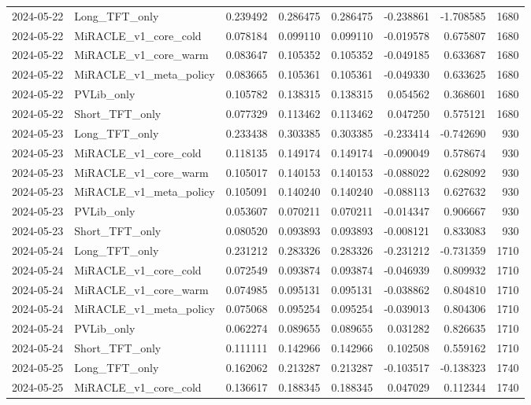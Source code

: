 \begin{tabular}{llrrrrrr}
2024-05-22 & Long_TFT_only & 0.239492 & 0.286475 & 0.286475 & -0.238861 & -1.708585 & 1680 \\
2024-05-22 & MiRACLE_v1_core_cold & 0.078184 & 0.099110 & 0.099110 & -0.019578 & 0.675807 & 1680 \\
2024-05-22 & MiRACLE_v1_core_warm & 0.083647 & 0.105352 & 0.105352 & -0.049185 & 0.633687 & 1680 \\
2024-05-22 & MiRACLE_v1_meta_policy & 0.083665 & 0.105361 & 0.105361 & -0.049330 & 0.633625 & 1680 \\
2024-05-22 & PVLib_only & 0.105782 & 0.138315 & 0.138315 & 0.054562 & 0.368601 & 1680 \\
2024-05-22 & Short_TFT_only & 0.077329 & 0.113462 & 0.113462 & 0.047250 & 0.575121 & 1680 \\
2024-05-23 & Long_TFT_only & 0.233438 & 0.303385 & 0.303385 & -0.233414 & -0.742690 & 930 \\
2024-05-23 & MiRACLE_v1_core_cold & 0.118135 & 0.149174 & 0.149174 & -0.090049 & 0.578674 & 930 \\
2024-05-23 & MiRACLE_v1_core_warm & 0.105017 & 0.140153 & 0.140153 & -0.088022 & 0.628092 & 930 \\
2024-05-23 & MiRACLE_v1_meta_policy & 0.105091 & 0.140240 & 0.140240 & -0.088113 & 0.627632 & 930 \\
2024-05-23 & PVLib_only & 0.053607 & 0.070211 & 0.070211 & -0.014347 & 0.906667 & 930 \\
2024-05-23 & Short_TFT_only & 0.080520 & 0.093893 & 0.093893 & -0.008121 & 0.833083 & 930 \\
2024-05-24 & Long_TFT_only & 0.231212 & 0.283326 & 0.283326 & -0.231212 & -0.731359 & 1710 \\
2024-05-24 & MiRACLE_v1_core_cold & 0.072549 & 0.093874 & 0.093874 & -0.046939 & 0.809932 & 1710 \\
2024-05-24 & MiRACLE_v1_core_warm & 0.074985 & 0.095131 & 0.095131 & -0.038862 & 0.804810 & 1710 \\
2024-05-24 & MiRACLE_v1_meta_policy & 0.075068 & 0.095254 & 0.095254 & -0.039013 & 0.804306 & 1710 \\
2024-05-24 & PVLib_only & 0.062274 & 0.089655 & 0.089655 & 0.031282 & 0.826635 & 1710 \\
2024-05-24 & Short_TFT_only & 0.111111 & 0.142966 & 0.142966 & 0.102508 & 0.559162 & 1710 \\
2024-05-25 & Long_TFT_only & 0.162062 & 0.213287 & 0.213287 & -0.103517 & -0.138323 & 1740 \\
2024-05-25 & MiRACLE_v1_core_cold & 0.136617 & 0.188345 & 0.188345 & 0.047029 & 0.112344 & 1740 \\

\end{tabular}
